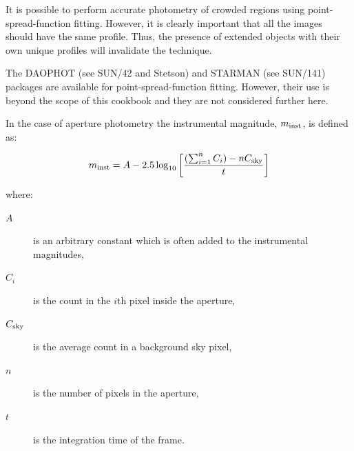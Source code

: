 \documentclass[twoside,11pt]{article}
\newcommand{\xref}[3]{#1}
\begin{document}
\begin{description}
   It is possible to perform accurate photometry of crowded regions
   using point-spread-function fitting.  However, it is clearly
   important that all the images should have the same profile.  Thus,
   the presence of extended objects with their own unique profiles
   will invalidate the technique.

   The DAOPHOT (see \xref{SUN/42}{sun42}{}\cite{SUN42} and
   Stetson\cite{STETSON87}) and STARMAN (see SUN/141\cite{SUN141})
   packages are available for
   point-spread-function fitting.  However, their use is beyond the scope
   of this cookbook and they are not considered further here.

\end{description}

In the case of aperture photometry the instrumental magnitude,
$m_{\rm inst}$, is defined as:

\begin{equation}
m_{\rm inst} = A - 2.5 \log_{10} \left[
       \frac{( \sum_{i=1}^{n} C_{i} )  - n C_{\rm sky} }{t}
       \right]  \label{INSTREQN}
\end{equation}

where:

\begin{description}

  \item[$A$] is an arbitrary constant which is often added to the
   instrumental magnitudes,

  \item[$C_{i}$] is the count in the $i$th pixel inside the aperture,

  \item[$C_{\rm sky}$] is the average count in a background sky pixel,

  \item[$n$] is the number of pixels in the aperture,

  \item[$t$] is the integration time of the frame.

\end{description}
\end{document}
